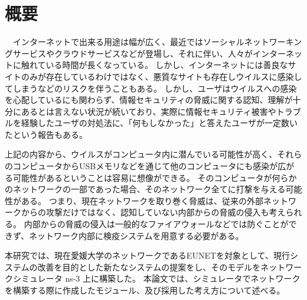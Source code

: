 \chapter*{概要}


　インターネットで出来る用途は幅が広く、最近ではソーシャルネットワーキングサービスやクラウドサービスなどが登場し、それに伴い、人々がインターネットに触れている時間が長くなっている。
しかし、インターネットには善良なサイトのみが存在しているわけではなく、悪質なサイトも存在しウイルスに感染してしまうなどのリスクを伴うこともある。
しかし、ユーザはウイルスへの感染を心配しているにも関わらず、情報セキュリティの脅威に関する認知、理解が十分にあるとは言えない状況が続いており、実際に情報セキュリティ被害やトラブルを経験したユーザの対処法に、「何もしなかった」と答えたユーザが一定数いたという報告もある\cite{joron1}。

上記の内容から、ウイルスがコンピュータ内に潜んでいる可能性が高く、それらのコンピュータからUSBメモリなどを通じて他のコンピュータにも感染が広がる可能性があるということは容易に想像ができる。
そのコンピュータが何らかのネットワークの一部であった場合、そのネットワーク全てに打撃を与える可能性がある。
つまり、現在ネットワークを取り巻く脅威は、従来の外部ネットワークからの攻撃だけではなく、認知していない内部からの脅威の侵入も考えられる。
内部からの脅威の侵入は一般的なファイアウォールなどでは防ぐことができず、ネットワーク内部に検疫システムを用意する必要がある。

本研究では、現在愛媛大学のネットワークであるEUNETを対象として、現行システムの改善を目的とした新たなシステムの提案をし、そのモデルをネットワークシミュレータ ns-3 上に構築した。
本論文では、シミュレータでネットワークを構築する際に作成したモジュール、及び採用した考え方について述べる。